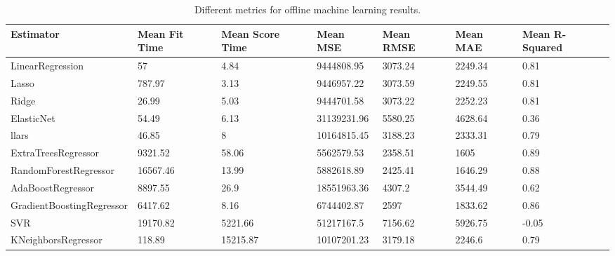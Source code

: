 \documentclass[final,3p,times,twocolumn,numbers]{elsarticle}
\begin{document}
\begin{table}[]
\footnotesize
	\begin{tabular}{@{}lllllll@{}}
		\toprule
		Estimator                 & Mean Fit Time & Mean Score Time & Mean MSE    & Mean RMSE & Mean MAE & Mean R-Squared \\ \midrule
		LinearRegression          & 57            & 4.84            & 9444808.95  & 3073.24   & 2249.34  & 0.81           \\
		Lasso                     & 787.97        & 3.13            & 9446957.22  & 3073.59   & 2249.55  & 0.81           \\
		Ridge                     & 26.99         & 5.03            & 9444701.58  & 3073.22   & 2252.23  & 0.81           \\
		ElasticNet                & 54.49         & 6.13            & 31139231.96 & 5580.25   & 4628.64  & 0.36           \\
		llars                     & 46.85         & 8               & 10164815.45 & 3188.23   & 2333.31  & 0.79           \\
		ExtraTreesRegressor       & 9321.52       & 58.06           & 5562579.53  & 2358.51   & 1605     & 0.89           \\
		RandomForestRegressor     & 16567.46      & 13.99           & 5882618.89  & 2425.41   & 1646.29  & 0.88           \\
		AdaBoostRegressor         & 8897.55       & 26.9            & 18551963.36 & 4307.2    & 3544.49  & 0.62           \\
		GradientBoostingRegressor & 6417.62       & 8.16            & 6744402.87  & 2597      & 1833.62  & 0.86           \\
		SVR                       & 19170.82      & 5221.66         & 51217167.5  & 7156.62   & 5926.75  & -0.05          \\
		KNeighborsRegressor       & 118.89        & 15215.87        & 10107201.23 & 3179.18   & 2246.6   & 0.79           \\ \bottomrule
	\end{tabular}
\caption{Different metrics for offline machine learning results.}
\label{table:offline_ml_metrics}
\end{table}
\end{document}
